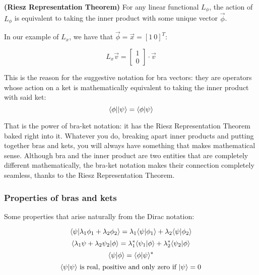 \begin{theorem}
    \textbf{(Riesz Representation Theorem)} For any linear functional $L_\phi$, the action of $L_\phi$ is equivalent to taking the inner product with some unique vector $\vec{\phi}$.
\end{theorem}

In our example of $L_x$, we have that $\vec{\phi} = \vec{x} = [1\ 0]^T$:

\begin{equation}
    L_x\vec{v} = \begin{bmatrix}
        1 \\ 0
    \end{bmatrix}\cdot \vec{v}    
\end{equation}

This is the reason for the suggestive notation for bra vectors: they are operators whose action on a ket is mathematically equivalent to taking the inner product with said ket:
\begin{equation}
    \langle\phi||\psi\rangle = \langle\phi|\psi\rangle
\end{equation}

That is the power of bra-ket notation: it has the Riesz Representation Theorem baked right into it. Whatever you do, breaking apart inner products and putting together bras and kets, you will always have something that makes mathematical sense. Although bra and the inner product are two entities that are completely different mathematically, the bra-ket notation makes their connection completely seamless, thanks to the Riesz Representation Theorem.


\subsubsection{Properties of bras and kets}

Some properties that arise naturally from the Dirac notation:

\begin{equation}
    \langle\psi|\lambda_1\phi_1+\lambda_2\phi_2\rangle = \lambda_1\langle\psi|\phi_1\rangle + \lambda_2\langle\psi|\phi_2\rangle
\end{equation}
\begin{equation}
    \langle\lambda_1\psi+\lambda_2\psi_2|\phi\rangle = \lambda_1^*\langle\psi_1|\phi\rangle + \lambda_2^*\langle\psi_2|\phi\rangle
\end{equation}
\begin{equation}
    \langle\psi|\phi\rangle = \langle\phi|\psi\rangle^*
\end{equation}
\begin{equation}
    \langle\psi|\psi\rangle\text{ is real, positive and only zero if }|\psi\rangle = 0
\end{equation}


